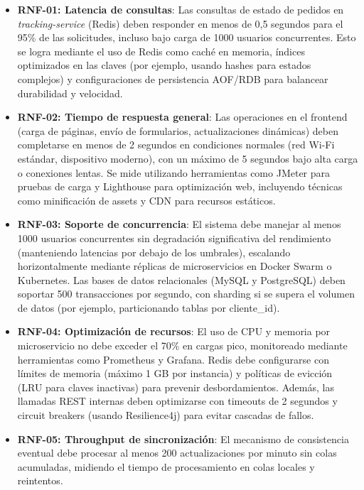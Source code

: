 \documentclass[a4paper,12pt]{article}
\begin{document}
\begin{itemize}
    \item \textbf{RNF-01: Latencia de consultas}: Las consultas de estado de pedidos en \textit{tracking-service} (Redis) deben responder en menos de 0,5 segundos para el 95\% de las solicitudes, incluso bajo carga de 1000 usuarios concurrentes. Esto se logra mediante el uso de Redis como caché en memoria, índices optimizados en las claves (por ejemplo, usando hashes para estados complejos) y configuraciones de persistencia AOF/RDB para balancear durabilidad y velocidad.
    
    \item \textbf{RNF-02: Tiempo de respuesta general}: Las operaciones en el frontend (carga de páginas, envío de formularios, actualizaciones dinámicas) deben completarse en menos de 2 segundos en condiciones normales (red Wi-Fi estándar, dispositivo moderno), con un máximo de 5 segundos bajo alta carga o conexiones lentas. Se mide utilizando herramientas como JMeter para pruebas de carga y Lighthouse para optimización web, incluyendo técnicas como minificación de assets y CDN para recursos estáticos.
    
    \item \textbf{RNF-03: Soporte de concurrencia}: El sistema debe manejar al menos 1000 usuarios concurrentes sin degradación significativa del rendimiento (manteniendo latencias por debajo de los umbrales), escalando horizontalmente mediante réplicas de microservicios en Docker Swarm o Kubernetes. Las bases de datos relacionales (MySQL y PostgreSQL) deben soportar 500 transacciones por segundo, con sharding si se supera el volumen de datos (por ejemplo, particionando tablas por cliente\_id).
    
    \item \textbf{RNF-04: Optimización de recursos}: El uso de CPU y memoria por microservicio no debe exceder el 70\% en cargas pico, monitoreado mediante herramientas como Prometheus y Grafana. Redis debe configurarse con límites de memoria (máximo 1 GB por instancia) y políticas de evicción (LRU para claves inactivas) para prevenir desbordamientos. Además, las llamadas REST internas deben optimizarse con timeouts de 2 segundos y circuit breakers (usando Resilience4j) para evitar cascadas de fallos.
    
    \item \textbf{RNF-05: Throughput de sincronización}: El mecanismo de consistencia eventual debe procesar al menos 200 actualizaciones por minuto sin colas acumuladas, midiendo el tiempo de procesamiento en colas locales y reintentos.
\end{itemize}
\end{document}
